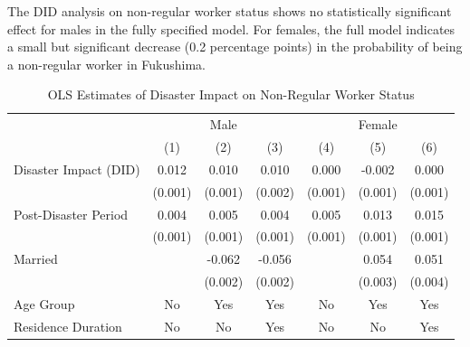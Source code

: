 \documentclass[serif, aspectratio=169]{beamer}
\begin{document}
\begin{frame}

The DID analysis on non-regular worker status shows no statistically significant effect for males in the fully specified model. For females, the full model indicates a small but significant decrease (0.2 percentage points) in the probability of being a non-regular worker in Fukushima.

\begin{table}[htbp]
\centering
\caption{OLS Estimates of Disaster Impact on Non-Regular Worker Status}

\vspace{-0.2cm}


\begin{tabular}{@{}l*{6}{c}@{}}
          &\multicolumn{3}{c}{Male}                                &\multicolumn{3}{c}{Female}                              \\\cmidrule(lr){2-4}\cmidrule(lr){5-7}
          &\multicolumn{1}{c}{(1)}         &\multicolumn{1}{c}{(2)}         &\multicolumn{1}{c}{(3)}         &\multicolumn{1}{c}{(4)}         &\multicolumn{1}{c}{(5)}         &\multicolumn{1}{c}{(6)}         \\
\toprule
Disaster Impact (DID)&    0.012\sym{***}&    0.010\sym{***}&    0.010\sym{***}&    0.000         &   -0.002\sym{**} &    0.000         \\
          &  (0.001)         &  (0.001)         &  (0.002)         &  (0.001)         &  (0.001)         &  (0.001)         \\
\addlinespace
Post-Disaster Period&    0.004\sym{**} &    0.005\sym{***}&    0.004\sym{**} &    0.005\sym{***}&    0.013\sym{***}&    0.015\sym{***}\\
          &  (0.001)         &  (0.001)         &  (0.001)         &  (0.001)         &  (0.001)         &  (0.001)         \\
\addlinespace
Married   &                  &   -0.062\sym{***}&   -0.056\sym{***}&                  &    0.054\sym{***}&    0.051\sym{***}\\
          &                  &  (0.002)         &  (0.002)         &                  &  (0.003)         &  (0.004)         \\
\midrule
Age Group &       No         &      Yes         &      Yes         &       No         &      Yes         &      Yes         \\
Residence Duration&       No         &       No         &      Yes         &       No         &       No         &      Yes         \\

\end{tabular}
\end{table}
\end{frame}
\end{document}
